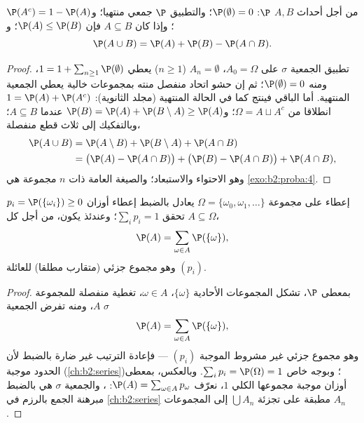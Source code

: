 \begin{proposition}\label{prop:b2:proba:rules}
من أجل أحداث $A, B$  $\P$: $\P(\emptyset) = 0$؛ والتطبيق $\P$
جمعي منتهيا؛ و$\P(A^c) = 1 -
\P(A)$؛ وإذا كان $A \subseteq B$ فإن $\P(A) \leq \P(B)$؛ و
\[
\P(A \cup B) = \P(A) + \P(B) - \P(A \cap B) .
\]
\end{proposition}

\begin{proof}
تطبيق الجمعية $\sigma$ على $A_0 = \Omega$، $A_n = \emptyset$ ($n \geq 1$) يعطي $1 = 1 + \sum_{n\geq1}\P(\emptyset)$، ومنه
$\P(\emptyset) = 0$؛ ثم إن حشو اتحاد منفصل منته بمجموعات خالية يعطي الجمعية
المنتهية. أما الباقي فينتج كما في الحالة المنتهية (مجلد الثانوية):
$1 = \P(A) + \P(A^c)$ انطلاقا من $\Omega = A \sqcup A^c$؛ و$\P(B) = \P(A) + \P(B \setminus A)
\geq \P(A)$ عندما $A \subseteq B$؛ وبالتفكيك إلى ثلاث
قطع منفصلة،
\begin{align*}
\P(A \cup B) &= \P(A \setminus B) + \P(B \setminus A) +
\P(A \cap B)\\
&= \bigl(\P(A) - \P(A\cap B)\bigr) + \bigl(\P(B) - \P(A\cap
B)\bigr) + \P(A \cap B),
\end{align*}
وهو الاحتواء والاستبعاد؛ والصيغة العامة ذات $n$ مجموعة هي \cref{exo:b2:proba:4}.
\end{proof}

\begin{proposition}\label{prop:b2:proba:distribution}
إعطاء  على مجموعة $\Omega =
\{\omega_0, \omega_1, \dots\}$  يعادل بالضبط إعطاء
أوزان $p_i = \P(\{\omega_i\}) \geq 0$ تحقق $\sum_i p_i = 1$؛ وعندئذ يكون، من أجل كل $A \subseteq \Omega$،
\[
\P(A) = \sum_{\omega \in A} \P(\{\omega\}) ,
\]
وهو مجموع جزئي (متقارب مطلقا) للعائلة $(p_i)$.
\end{proposition}

\begin{proof}
بمعطى $\P$، تشكل المجموعات الأحادية $\{\omega\}$، $\omega \in A$، تغطية منفصلة
 للمجموعة $A$، ومنه تفرض الجمعية $\sigma$
\[
\P(A) = \sum_{\omega\in A}\P(\{\omega\}),
\]
وهو مجموع جزئي غير مشروط  الموجبة $(p_i)$ ---
فإعادة الترتيب غير ضارة بالضبط لأن الحدود موجبة (\cref{ch:b2:series})؛ وبوجه خاص
$\sum_ip_i = \P(\Omega) = 1$.
وبالعكس، بمعطى أوزان موجبة مجموعها الكلي $1$، نعرّف $\P(A) = \sum_{\omega \in A}p_\omega$: ، والجمعية $\sigma$ هي بالضبط مبرهنة الجمع بالرزم في \cref{ch:b2:series}
مطبقة على تجزئة $\bigcup A_n$ إلى المجموعات $A_n$.
\end{proof}


